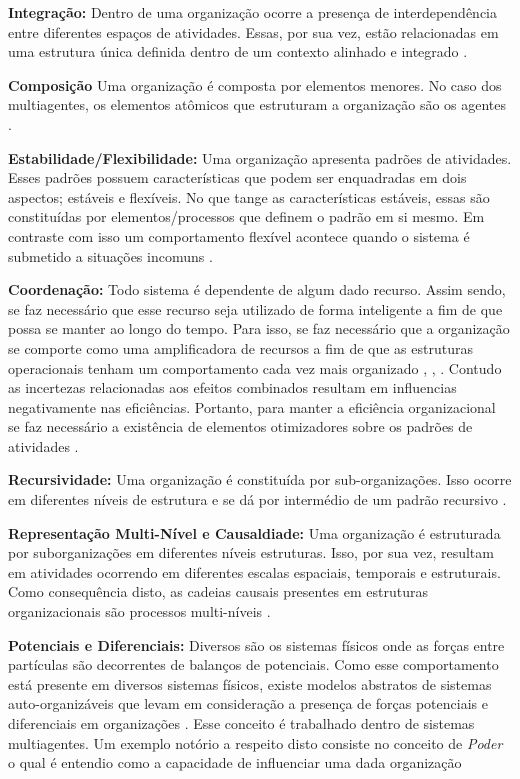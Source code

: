 \textbf{Integração:} Dentro de uma organização ocorre a presença de interdependência entre diferentes espaços de atividades. Essas, por sua vez, estão relacionadas em uma estrutura única definida dentro de um contexto alinhado e integrado \cite{organiationofmultiagentsystem}.

\textbf{Composição} Uma organização é composta por elementos menores. No caso dos multiagentes, os elementos atômicos que estruturam a organização são os agentes \cite{organiationofmultiagentsystem}.

\textbf{Estabilidade/Flexibilidade:} Uma organização apresenta padrões de atividades. Esses padrões possuem características que podem ser enquadradas em dois aspectos; estáveis e flexíveis. No que tange as características estáveis, essas são constituídas por elementos/processos que definem o padrão em si mesmo. Em contraste com isso um comportamento flexível acontece quando o sistema é submetido a situações incomuns \cite{organiationofmultiagentsystem}.

\textbf{Coordenação:} Todo sistema é dependente de algum dado recurso. Assim sendo, se faz necessário que esse recurso seja utilizado de forma inteligente a fim de que possa se manter ao longo do tempo. Para isso, se faz necessário que a organização se comporte como uma amplificadora de recursos a fim de que as estruturas operacionais tenham um comportamento cada vez mais organizado 
\cite{selforganization}, \cite{selforganizatioenvoriment}, \cite{defintionselforganization}. Contudo as incertezas relacionadas aos efeitos combinados resultam em influencias negativamente nas eficiências. Portanto, para manter a eficiência organizacional se faz necessário a existência de elementos otimizadores sobre os padrões de atividades \cite{organiationofmultiagentsystem}.

\textbf{Recursividade:} Uma organização é constituída por sub-organizações. Isso ocorre em diferentes níveis de estrutura e se dá por intermédio de um padrão recursivo \cite{organiationofmultiagentsystem}.

\textbf{Representação Multi-Nível e Causaldiade:} Uma organização é estruturada por suborganizações em diferentes níveis estruturas. Isso, por sua vez, resultam em atividades ocorrendo em diferentes escalas espaciais, temporais e estruturais. Como consequência disto, as cadeias causais presentes em estruturas organizacionais são processos multi-níveis \cite{organiationofmultiagentsystem}.

\textbf{Potenciais e Diferenciais:} Diversos são os sistemas físicos onde as forças entre partículas são decorrentes de balanços de potenciais. Como esse comportamento está presente em diversos sistemas físicos, existe modelos abstratos de sistemas auto-organizáveis que levam em consideração a presença de forças potenciais e diferenciais em organizações \cite{selforganizationdiffforce}. Esse conceito é trabalhado dentro de sistemas multiagentes. Um exemplo notório a respeito disto consiste no conceito de \textit{Poder} o qual é entendio como a capacidade de influenciar uma dada organização \cite{organiationofmultiagentsystem}


